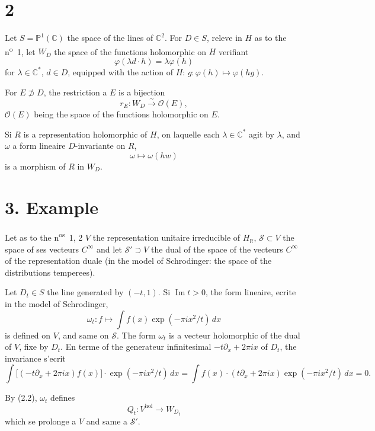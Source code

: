 \documentclass[12pt,a4paper]{article}
\theoremstyle{plain}
\theoremstyle{definition}
\theoremstyle{remark}
\DeclareMathOperator{\Impart}{Im}
\begin{document}
\section*{2}

Let $S = \mathbb{P}^1(\mathbb{C})$ the space of the lines of $\mathbb{C}^2$. For $D \in S$, releve in $H$ as to the n\textsuperscript{o}~1, let $W_D$ the space of the functions holomorphic on $H$ verifiant
\[\varphi(\lambda d \cdot h) = \lambda\varphi(h)\]
for $\lambda \in \mathbb{C}^*$, $d \in D$, equipped with the action of $H$: $g \colon \varphi(h) \mapsto \varphi(hg)$.

For $E \not\supset D$, the restriction a $E$ is a bijection
\begin{equation}\label{eq:2.1}
r_E \colon W_D \xrightarrow{\sim} \mathcal{O}(E),\tag{2.1}
\end{equation}
$\mathcal{O}(E)$ being the space of the functions holomorphic on $E$.

Si $R$ is a representation holomorphic of $H$, on laquelle each $\lambda \in \mathbb{C}^*$ agit by $\lambda$, and $\omega$ a form lineaire $D$-invariante on $R$,
\begin{equation}\label{eq:2.2}
\omega \mapsto \omega(hw)\tag{2.2}
\end{equation}
is a morphism of $R$ in $W_D$.

\section*{3. Example}

Let as to the n\textsuperscript{os}~1, 2 $V$ the representation unitaire irreducible of $H_\mathbb{R}$, $\mathcal{S} \subset V$ the space of ses vecteurs $C^\infty$ and let $\mathcal{S}' \supset V$ the dual of the space of the vecteurs $C^\infty$ of the representation duale (in the model of Schrodinger: the space of the distributions temperees).

Let $D_t \in S$ the line generated by $(-t, 1)$. Si $\Impart t > 0$, the form lineaire, ecrite in the model of Schrodinger,
\[\omega_t \colon f \mapsto \int f(x)\exp(-\pi ix^2/t)\,dx\]
is defined on $V$, and same on $\mathcal{S}$. The form $\omega_t$ is a vecteur holomorphic of the dual of $V$, fixe by $D_t$. En terme of the generateur infinitesimal $-t\partial_x + 2\pi ix$ of $D_t$, the invariance s'ecrit
\[\int \bigl[(-t\partial_x + 2\pi ix)f(x)\bigr] \cdot \exp(-\pi ix^2/t)\,dx = \int f(x) \cdot (t\partial_x + 2\pi ix)\exp(-\pi ix^2/t)\,dx = 0.\]

By (2.2), $\omega_t$ defines
\[Q_t \colon V^{\mathrm{hol}} \to W_{D_t}\]
which se prolonge a $V$ and same a $\mathcal{S}'$.
\end{document}

